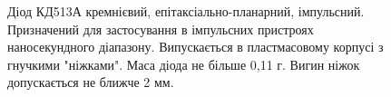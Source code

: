\documentclass[a4paper,14pt]{extreport}
\begin{document}
  \begin{figure}
  \vspace{-0.7 cm}
  \parbox{12cm}{%
    \begin{tcolorbox}[width=12cm,right=0.5cm]
    Діод КД513А кремнієвий, епітаксіально-планарний, імпульсний.
    Призначений для застосування в імпульсних пристроях наносекундного діапазону. Випускається в пластмасовому корпусі з гнучкими "ніжками". Маса діода не більше 0,11 г. Вигин ніжок допускається не ближче 2 мм.
    \end{tcolorbox}}
  \end{figure}

  \vspace{0.5 cm}\par
  \par
  \vspace{0.2 cm}\par
  \par
  \vspace{0.2 cm}\par
  \par
  \vspace{0.2 cm}\par
  \par
  \vspace{0.2 cm}\par
  \par
  \vspace{0.2 cm}\par
  \par
  \vspace{0.5 cm}\par
\end{document}
